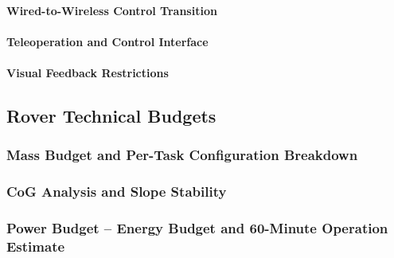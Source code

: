 \paragraph{Wired-to-Wireless Control Transition}
\label{par:wired_to_wireless_control_transition}


\paragraph{Teleoperation and Control Interface}
\label{par:teleoperation_control_interface}


\paragraph{Visual Feedback Restrictions}
\label{par:visual_feedback_restrictions}


\subsection{Rover Technical Budgets}
\label{subsec:rover_technical_budgets}

\subsubsection{Mass Budget and Per-Task Configuration Breakdown}
\label{subsubsec:mass_budget_per_task_configuration_breakdown}


\subsubsection{CoG Analysis and Slope Stability}
\label{subsubsec:cog_analysis_slope_stability}


\subsubsection{Power Budget -- Energy Budget and 60-Minute Operation Estimate}
\label{subsubsec:power_budget_energy_budget_operation_estimate}


